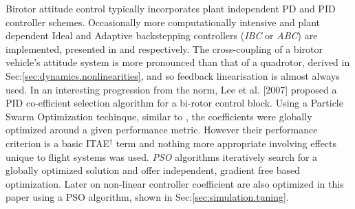 Birotor attitude control typically incorporates plant independent PD \cite{obliquepitch} and PID \cite{tiltrotorUAV} controller schemes. Occasionally more computationally intensive and plant dependent Ideal and Adaptive backstepping controllers (\emph{IBC} or \emph{ABC}) are implemented, presented in \cite{smalltwotilting,tpheonix} and \cite{adaptivebackstep} respectively. The cross-coupling of a birotor vehicle's attitude system is more pronounced than that of a quadrotor, derived in Sec:\ref{sec:dynamics.nonlinearities}, and so feedback linearisation is almost always used. In an interesting progression from the norm, Lee et al. [2007]\cite{autopilotPSO} proposed a PID co-efficient selection algorithm for a bi-rotor control block. Using a Particle Swarm Optimization techinque, similar to \cite{adaptivepso}, the coefficients were globally optimized around a given performance metric. However their performance criterion is a basic ITAE$^\dagger$ term and nothing more appropriate involving effects unique to flight systems was used. \emph{PSO} algorithms iteratively search for a globally optimized solution and offer independent, gradient free based optimization. Later on non-linear controller coefficient are also optimized in this paper using a PSO algorithm, shown in Sec:\ref{sec:simulation.tuning}.
\par
